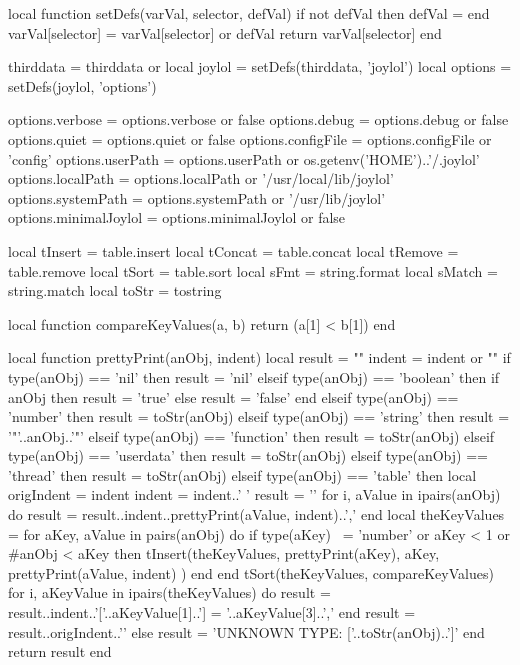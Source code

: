 local function setDefs(varVal, selector, defVal)
  if not defVal then defVal = { } end
  varVal[selector] = varVal[selector] or defVal
  return varVal[selector]
end

thirddata          = thirddata        or {}
local joylol       = setDefs(thirddata, 'joylol')
local options      = setDefs(joylol, 'options')

options.verbose    =
  options.verbose    or false
options.debug      =
  options.debug      or false
options.quiet      =
  options.quiet      or false
options.configFile =
  options.configFile or 'config'
options.userPath   =
  options.userPath   or os.getenv('HOME')..'/.joylol'
options.localPath  =
  options.localPath  or '/usr/local/lib/joylol'
options.systemPath =
  options.systemPath or '/usr/lib/joylol'
options.minimalJoylol = 
  options.minimalJoylol or false

local tInsert = table.insert
local tConcat = table.concat
local tRemove = table.remove
local tSort   = table.sort
local sFmt    = string.format
local sMatch  = string.match
local toStr   = tostring
  
local function compareKeyValues(a, b)
  return (a[1] < b[1])
end

local function prettyPrint(anObj, indent)
  local result = ""
  indent = indent or ""
  if type(anObj) == 'nil' then
    result = 'nil'
  elseif type(anObj) == 'boolean' then
    if anObj then result = 'true' else result = 'false' end
  elseif type(anObj) == 'number' then
    result = toStr(anObj)
  elseif type(anObj) == 'string' then
    result = '"'..anObj..'"'
  elseif type(anObj) == 'function' then
    result = toStr(anObj)
  elseif type(anObj) == 'userdata' then
    result = toStr(anObj)
  elseif type(anObj) == 'thread' then
    result = toStr(anObj)
  elseif type(anObj) == 'table' then
    local origIndent = indent
    indent = indent..'  '
    result = '{\n'
    for i, aValue in ipairs(anObj) do
      result = result..indent..prettyPrint(aValue, indent)..',\n'
    end
    local theKeyValues = { }
    for aKey, aValue in pairs(anObj) do
      if type(aKey) ~= 'number' or aKey < 1 or #anObj < aKey then
        tInsert(theKeyValues,
          { prettyPrint(aKey), aKey, prettyPrint(aValue, indent) })
      end
    end
    tSort(theKeyValues, compareKeyValues)
    for i, aKeyValue in ipairs(theKeyValues) do
      result = result..indent..'['..aKeyValue[1]..'] = '..aKeyValue[3]..',\n'
    end
    result = result..origIndent..'}'
  else
    result = 'UNKNOWN TYPE: ['..toStr(anObj)..']'
  end
  return result
end

\stopLuaCode